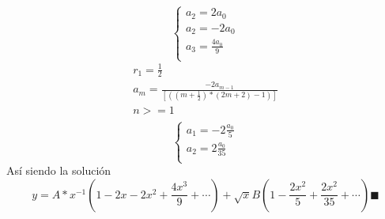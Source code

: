 \begin{mdframed}
\begin{equation}
    \begin{cases}
        a_2=2{a_0}\\
        a_2=-2{a_0}\\
        a_3=\frac{4a_0}{9}\\
    \end{cases}
\end{equation}
    \begin{gather*}
        r_1 = \frac{1}{2}\\
        a_m=\frac{-2a_{m-1}}{[(({m+\frac{1}{2}})*({2m+2}) -1)]}\\
        n>=1\\
    \end{gather*}
    \begin{equation}
    \begin{cases}
        a_1=-2\frac{a_0}{5}\\
        a_2=2\frac{a_0}{35}\\
    \end{cases}
\end{equation}
Así siendo la solución
$$y = A*x^{-1}(1-2x-2x^2+\frac{4x^3}{9}+\cdots)+\sqrt{x}B(1-\frac{2x^2}{5}+\frac{2x^2}{35}+\cdots) \blacksquare$$
\end{mdframed}

